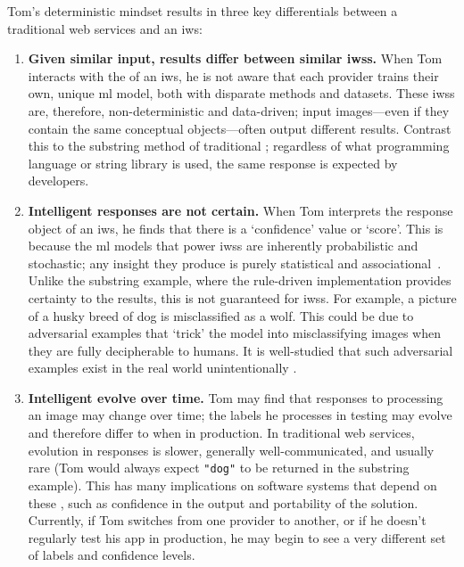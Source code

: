 Tom's deterministic mindset results in three key differentials between a traditional web services and an \gls{iws}:
\begin{enumerate}[label=\textbf{(\arabic*)}]
    \item \textbf{Given similar input, results differ between similar \glspl{iws}.}
    When Tom interacts with the  of an \gls{iws}, he is not aware that each  provider trains their own, unique \gls{ml} model, both with disparate methods and datasets. These \glspl{iws} are, therefore, non-deterministic and data-driven; input images---even if they contain the same conceptual objects---often output different results. Contrast this to the substring method of traditional ; regardless of what programming language or string library is used, the same response is expected by developers.
    \item \textbf{Intelligent responses are not certain.}
    When Tom interprets the response object of an \gls{iws}, he finds that there is a `confidence' value or `score'. This is because the \gls{ml} models that power \glspl{iws} are inherently probabilistic and stochastic; any insight they produce is purely statistical and associational~\citep{Pearl:2018uv}. Unlike the substring example, where the rule-driven implementation provides certainty to the results, this is not guaranteed for \glspl{iws}.
    For example, a picture of a husky breed of dog is misclassified as a wolf. This could be due to adversarial examples \citep{Szegedy:2013vw} that `trick' the model into misclassifying images when they are fully decipherable to humans. It is well-studied that such adversarial examples exist in the real world unintentionally \citep{Kurakin:2016vw,Eykholt:2018vk,Pezzementi:2018tq}.
    \item \textbf{Intelligent  evolve over time.}
    Tom may find that responses to processing an image may change over time; the labels he processes in testing may evolve and therefore differ to when in production. In traditional web services, evolution in responses is slower, generally well-communicated, and usually rare (Tom would always expect \texttt{"dog"} to be returned in the substring example). This has many implications on software systems that depend on these , such as confidence in the output and portability of the solution. Currently, if Tom switches from one  provider to another, or if he doesn't regularly test his app in production, he may begin to see a very different set of labels and confidence levels.
\end{enumerate}

